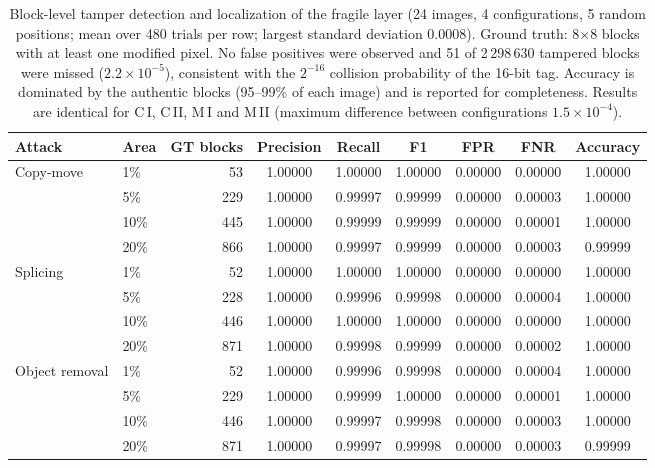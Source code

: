 \begin{table}[t]
\centering
\caption{Block-level tamper detection and localization of the fragile layer (24 images, 4 configurations, 5 random positions; mean over 480 trials per row; largest standard deviation 0.0008). Ground truth: 8$\times$8 blocks with at least one modified pixel. No false positives were observed and 51 of 2\,298\,630 tampered blocks were missed ($2.2\times 10^{-5}$), consistent with the $2^{-16}$ collision probability of the 16-bit tag. Accuracy is dominated by the authentic blocks (95--99\% of each image) and is reported for completeness. Results are identical for C\,I, C\,II, M\,I and M\,II (maximum difference between configurations $1.5\times 10^{-4}$).}
\label{tab:tamper_localization}
\footnotesize
\setlength{\tabcolsep}{4pt}
\begin{tabular}{llrcccccc}
\toprule
Attack & Area & GT blocks & Precision & Recall & F1 & FPR & FNR & Accuracy \\
\midrule
Copy-move & 1\% & 53 & 1.00000 & 1.00000 & 1.00000 & 0.00000 & 0.00000 & 1.00000 \\
 & 5\% & 229 & 1.00000 & 0.99997 & 0.99999 & 0.00000 & 0.00003 & 1.00000 \\
 & 10\% & 445 & 1.00000 & 0.99999 & 0.99999 & 0.00000 & 0.00001 & 1.00000 \\
 & 20\% & 866 & 1.00000 & 0.99997 & 0.99999 & 0.00000 & 0.00003 & 0.99999 \\
\midrule
Splicing & 1\% & 52 & 1.00000 & 1.00000 & 1.00000 & 0.00000 & 0.00000 & 1.00000 \\
 & 5\% & 228 & 1.00000 & 0.99996 & 0.99998 & 0.00000 & 0.00004 & 1.00000 \\
 & 10\% & 446 & 1.00000 & 1.00000 & 1.00000 & 0.00000 & 0.00000 & 1.00000 \\
 & 20\% & 871 & 1.00000 & 0.99998 & 0.99999 & 0.00000 & 0.00002 & 1.00000 \\
\midrule
Object removal & 1\% & 52 & 1.00000 & 0.99996 & 0.99998 & 0.00000 & 0.00004 & 1.00000 \\
 & 5\% & 229 & 1.00000 & 0.99999 & 1.00000 & 0.00000 & 0.00001 & 1.00000 \\
 & 10\% & 446 & 1.00000 & 0.99997 & 0.99998 & 0.00000 & 0.00003 & 1.00000 \\
 & 20\% & 871 & 1.00000 & 0.99997 & 0.99998 & 0.00000 & 0.00003 & 0.99999 \\
\bottomrule
\end{tabular}
\end{table}
